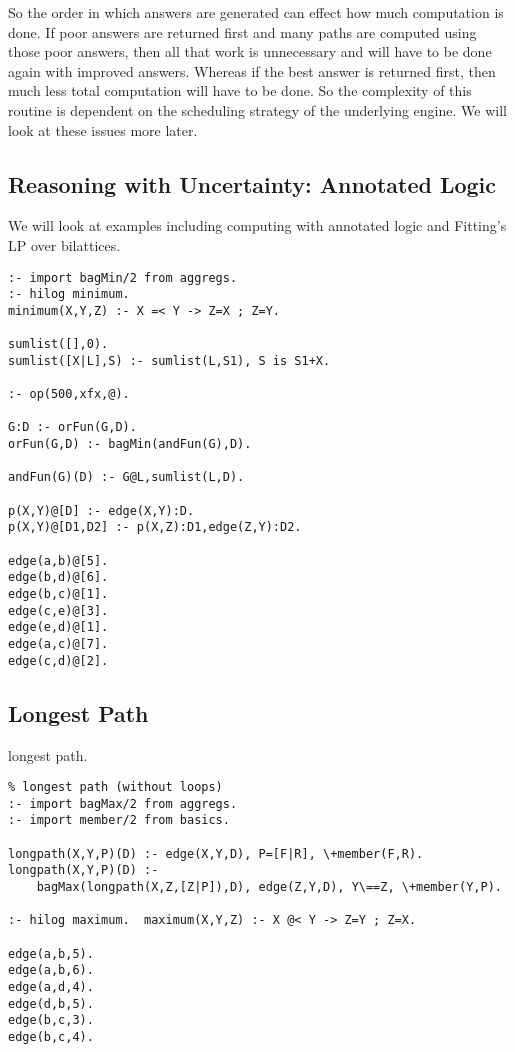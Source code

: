 So the order in which answers are generated can effect how much
computation is done.  If poor answers are returned first and many
paths are computed using those poor answers, then all that work is
unnecessary and will have to be done again with improved answers.
Whereas if the best answer is returned first, then much less total
computation will have to be done.  So the complexity of this routine
is dependent on the scheduling strategy of the underlying engine.  We
will look at these issues more later.

\subsection{Reasoning with Uncertainty: Annotated Logic}

We will look at examples including computing with annotated logic and
Fitting's LP over bilattices.

\begin{verbatim}
:- import bagMin/2 from aggregs.
:- hilog minimum.
minimum(X,Y,Z) :- X =< Y -> Z=X ; Z=Y.

sumlist([],0).
sumlist([X|L],S) :- sumlist(L,S1), S is S1+X.

:- op(500,xfx,@).

G:D :- orFun(G,D).
orFun(G,D) :- bagMin(andFun(G),D).

andFun(G)(D) :- G@L,sumlist(L,D).

p(X,Y)@[D] :- edge(X,Y):D.
p(X,Y)@[D1,D2] :- p(X,Z):D1,edge(Z,Y):D2.

edge(a,b)@[5].
edge(b,d)@[6].
edge(b,c)@[1].
edge(c,e)@[3].
edge(e,d)@[1].
edge(a,c)@[7].
edge(c,d)@[2].
\end{verbatim}


\subsection{Longest Path}

longest path.

\begin{verbatim}
% longest path (without loops)
:- import bagMax/2 from aggregs.
:- import member/2 from basics.

longpath(X,Y,P)(D) :- edge(X,Y,D), P=[F|R], \+member(F,R).
longpath(X,Y,P)(D) :- 
	bagMax(longpath(X,Z,[Z|P]),D), edge(Z,Y,D), Y\==Z, \+member(Y,P).

:- hilog maximum.  maximum(X,Y,Z) :- X @< Y -> Z=Y ; Z=X.

edge(a,b,5).
edge(a,b,6).
edge(a,d,4).
edge(d,b,5).
edge(b,c,3).
edge(b,c,4).
\end{verbatim}

